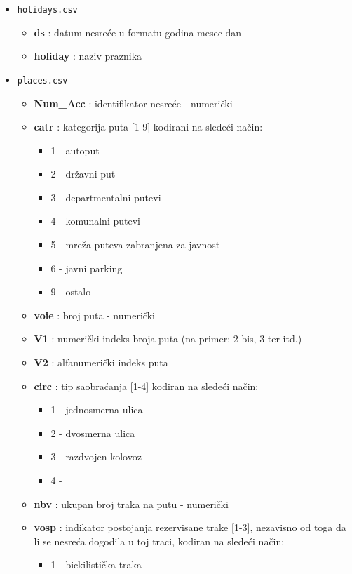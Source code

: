 \documentclass[a4paper,10pt]{article}
\begin{document}
\begin{itemize}
\begin{itemize}
 \end{itemize}

 \item \texttt{holidays.csv}
 \begin{itemize}
  \item \textbf{ds} : datum nesreće u formatu godina-mesec-dan
  \item \textbf{holiday} : naziv praznika
 \end{itemize}
 
 \item \texttt{places.csv}
 \begin{itemize}
  \item \textbf{Num\_Acc} : identifikator nesreće - numerički
  \item \textbf{catr} : kategorija puta [1-9] kodirani na sledeći način:
	\begin{itemize}
	 \item 1 - autoput
	 \item 2 - državni put
	 \item 3 - departmentalni putevi
	 \item 4 - komunalni putevi
	 \item 5 - mreža puteva zabranjena za javnost
	 \item 6 - javni parking
	 \item 9 - ostalo
	\end{itemize}
  \item \textbf{voie} : broj puta - numerički
  \item \textbf{V1} : numerički indeks broja puta (na primer: 2 bis, 3 ter itd.)
  \item \textbf{V2} : alfanumerički indeks puta
  \item \textbf{circ} : tip saobraćanja [1-4] kodiran na sledeći način:
	\begin{itemize}
	 \item 1 - jednosmerna ulica
	 \item 2 - dvosmerna ulica
	 \item 3 - razdvojen kolovoz
	 \item 4 - 
	\end{itemize}
  \item \textbf{nbv} : ukupan broj traka na putu - numerički
  \item \textbf{vosp} : indikator postojanja rezervisane trake [1-3], 
			nezavisno od toga da li se nesreća dogodila u toj traci, kodiran na sledeći način:
	\begin{itemize}
	 \item 1 - bickilistička traka

\end{itemize}
\end{itemize}
\end{itemize}
\end{document}
